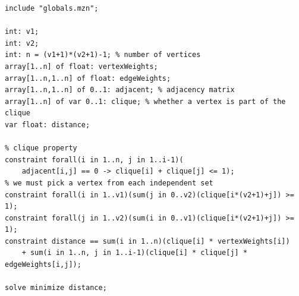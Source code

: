 \documentclass{article}
\theoremstyle{definition}
\begin{document}
\begin{lstlisting}
include "globals.mzn";

int: v1;
int: v2;
int: n = (v1+1)*(v2+1)-1; % number of vertices
array[1..n] of float: vertexWeights;
array[1..n,1..n] of float: edgeWeights;
array[1..n,1..n] of 0..1: adjacent; % adjacency matrix
array[1..n] of var 0..1: clique; % whether a vertex is part of the clique
var float: distance;

% clique property
constraint forall(i in 1..n, j in 1..i-1)(
    adjacent[i,j] == 0 -> clique[i] + clique[j] <= 1);
% we must pick a vertex from each independent set
constraint forall(i in 1..v1)(sum(j in 0..v2)(clique[i*(v2+1)+j]) >= 1);
constraint forall(j in 1..v2)(sum(i in 0..v1)(clique[i*(v2+1)+j]) >= 1);
constraint distance == sum(i in 1..n)(clique[i] * vertexWeights[i])
    + sum(i in 1..n, j in 1..i-1)(clique[i] * clique[j] * edgeWeights[i,j]);

solve minimize distance;
\end{lstlisting}
\end{document}
